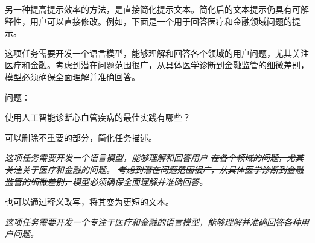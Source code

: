 另一种提高提示效率的方法，是直接简化提示文本。简化后的文本提示仍具有可解释性，用户可以直接修改。例如，下面是一个用于回答医疗和金融领域问题的提示。

\vspace{0.5em}
\begin{tcolorbox}

\begingroup
\setlength{\leftskip}{2em}
\setlength{\rightskip}{2em}

这项任务需要开发一个语言模型，能够理解和回答各个领域的用户问题，尤其关注医疗和金融。考虑到潜在问题范围很广，从具体医学诊断到金融监管的细微差别，模型必须确保全面理解并准确回答。

\vspace{0.5em}

问题：

\vspace{0.2em}

使用人工智能诊断心血管疾病的最佳实践有哪些？

\vspace{0.5em}

\underline{\hspace{2em}}

\endgroup

\end{tcolorbox}
\vspace{0.5em}

可以删除不重要的部分，简化任务描述。

\vspace{0.5em}

\begin{center}
\parbox{0.8\linewidth}{
\textit{这项任务需要开发一个语言模型，能够理解和回答用户{\color{gray} \sout{在各个领域的问题，尤其关注}}关于医疗和金融的问题。{\color{gray} \sout{考虑到潜在问题范围很广，从具体医学诊断到金融监管的细微差别，}}模型必须确保全面理解并准确回答。}
}
\end{center}

\vspace{0.5em}

也可以通过释义改写，将其变为更短的文本。

\vspace{0.5em}

\begin{center}
\parbox{0.8\linewidth}{
\textit{这项任务需要开发一个专注于医疗和金融的语言模型，能够理解并准确回答各种用户问题。}
}
\end{center}

\vspace{0.5em}


